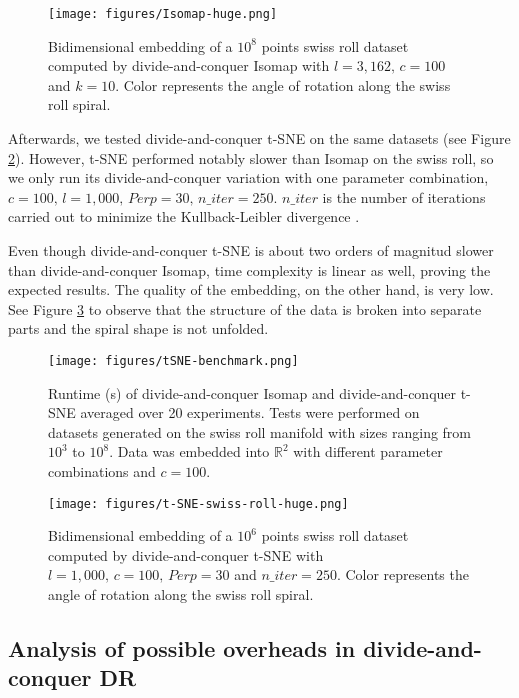 \begin{figure}[ht]
    \centering
    \texttt{[image: figures/Isomap-huge.png]}
    \caption{Bidimensional embedding of a $10^8$ points swiss roll dataset \citep{Spiwokv2007} computed by divide-and-conquer Isomap with $l=3,162, \, c=100$ and $k=10$. Color represents the angle of rotation along the swiss roll spiral.}
    \label{fig:Isomap-huge}
\end{figure}

Afterwards, we tested divide-and-conquer t-SNE on the same datasets (see Figure \ref{fig:t-SNE-benchmark}). However, t-SNE performed notably slower than Isomap on the swiss roll, so we only run its divide-and-conquer variation with one parameter combination, $c = 100, \, l=1,000, \, Perp=30, \, n\_iter=250$. $n\_iter$ is the number of iterations carried out to minimize the Kullback-Leibler divergence \citep{Kullback1951}.

Even though divide-and-conquer t-SNE is about two orders of magnitud slower than divide-and-conquer Isomap, time complexity is linear as well, proving the expected results. The quality of the embedding, on the other hand, is very low. See Figure \ref{fig:t-SNE-huge} to observe that the structure of the data is broken into separate parts and the spiral shape is not unfolded.

\begin{figure}[ht]
    \centering
    \texttt{[image: figures/tSNE-benchmark.png]}
    \caption{Runtime (s) of divide-and-conquer Isomap and divide-and-conquer t-SNE averaged over 20 experiments. Tests were performed on datasets generated on the swiss roll manifold \citep{Spiwokv2007} with sizes ranging from $10^3$ to $10^8$. Data was embedded into $\mathbb{R}^2$ with different parameter combinations and $c=100$.}
    \label{fig:t-SNE-benchmark}
\end{figure}

\begin{figure}[ht]
    \centering
    \texttt{[image: figures/t-SNE-swiss-roll-huge.png]}
    \caption{Bidimensional embedding of a $10^6$ points swiss roll dataset \citep{Spiwokv2007} computed by divide-and-conquer t-SNE with $l=1,000, \, c=100, \, Perp=30$ and $n\_iter=250$. Color represents the angle of rotation along the swiss roll spiral.}
    \label{fig:t-SNE-huge}
\end{figure}

\subsection{Analysis of possible overheads in divide-and-conquer DR}

